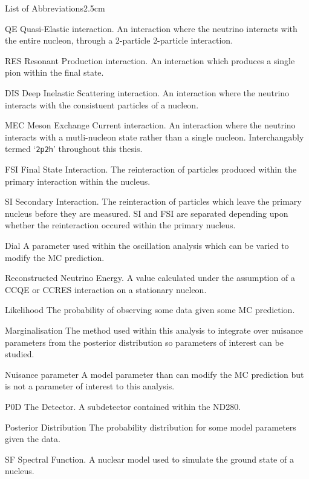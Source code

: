 \begin{mclistof}{List of Abbreviations}{2.5cm}
\item[QE]Quasi-Elastic interaction. An interaction where the neutrino interacts with the entire nucleon, through a 2-particle \quickmath{\rightarrow} 2-particle interaction.
\item[RES]Resonant Production interaction. An interaction which produces a single pion within the final state.
\item[DIS]Deep Inelastic Scattering interaction. An interaction where the neutrino interacts with the consistuent particles of a nucleon.
\item[MEC]Meson Exchange Current interaction. An interaction where the neutrino interacts with a mutli-nucleon state rather than a single nucleon. Interchangably termed `\texttt{2p2h}' throughout this thesis.
\item[FSI]Final State Interaction. The reinteraction of particles produced within the primary interaction within the nucleus.
\item[SI]Secondary Interaction. The reinteraction of particles which leave the primary nucleus before they are measured. SI and FSI are separated depending upon whether the reinteraction occured within the primary nucleus.
  
\item[Dial]A parameter used within the oscillation analysis which can be varied to modify the MC prediction.
\item[\quickmath{E_{rec}}]Reconstructed Neutrino Energy. A value calculated under the assumption of a CCQE or CCRES interaction on a stationary nucleon.

\item[Likelihood]The probability of observing some data given some MC prediction.
\item[Marginalisation]The method used within this analysis to integrate over nuisance parameters from the posterior distribution so parameters of interest can be studied.
\item[Nuisance parameter]A model parameter than can modify the MC prediction but is not a parameter of interest to this analysis.
\item[P0D]The  Detector. A subdetector contained within the ND280.
\item[Posterior Distribution]The probability distribution for some model parameters given the data.
\item[SF]Spectral Function. A nuclear model used to simulate the ground state of a nucleus.
  
\end{mclistof} 
